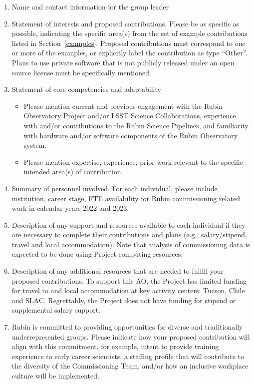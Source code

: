 \documentclass[SE,authoryear,toc]{lsstdoc}
\begin{document}
\begin{enumerate}
\item Name and contact information for the group leader

\item Statement of interests and proposed contributions. Please be as specific as possible, indicating the specific area(s) from the set of example contributions listed in Section~\ref{examples}. Proposed contributions must correspond to one or more of the examples, or explicitly label the contribution as type ``Other''. Plans to use private software that is not publicly released under an open source license must be specifically mentioned.

\item Statement of core competencies and adaptability
\begin{itemize}
\item Please mention current and previous engagement with the Rubin Observatory Project and/or LSST Science Collaborations, experience with and/or contributions to the Rubin Science Pipelines, and familiarity with hardware and/or software components of the Rubin Observatory system.
\item Please mention expertise, experience, prior work relevant to the specific intended area(s) of contribution.
\end{itemize}

\item Summary of personnel involved. For each individual, please include institution, career stage, FTE availability for Rubin commissioning related work in calendar years 2022 and 2023. 

\item Description of any support and resources available to each individual if they are necessary to complete their contributions and plans (e.g., salary/stipend, travel and local accommodation). Note that analysis of commissioning data is expected to be done using Project computing resources.

\item Description of any additional resources that are needed to fulfill your proposed contributions. To support this AO, the Project has limited funding for travel to and local accommodation at key activity centers: Tucson, Chile and SLAC.  Regrettably, the Project does not have funding for stipend or supplemental salary support.

\item Rubin is committed to providing opportunities for diverse and traditionally underrepresented groups. Please indicate how your proposed contribution will align with this commitment, for example, intent to provide training experience to early career scientists, a staffing profile that will contribute to the diversity of the Commissioning Team, and/or how an inclusive workplace culture will be implemented. 
\end{enumerate}
\end{document}
